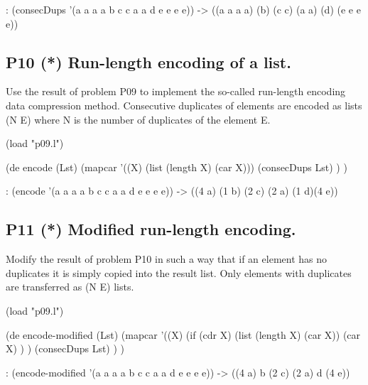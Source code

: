 \begin{wideverbatim}
   : (consecDups '(a a a a b c c a a d e e e e))
   -> ((a a a a) (b) (c c) (a a) (d) (e e e e))
\end{wideverbatim}

\subsection*{{P10} (*) Run-length encoding of a list.}
\label{sec:99-problems-P10}

Use the result of problem P09 to implement the so-called run-length
encoding data compression method. Consecutive duplicates of elements are
encoded as lists (N E) where N is the number of duplicates of the
element E.

\begin{wideverbatim}

(load "p09.l")

(de encode (Lst)
   (mapcar
      '((X) (list (length X) (car X)))
      (consecDups Lst) ) )

\end{wideverbatim}

\begin{wideverbatim}
   : (encode '(a a a a b c c a a d e e e e))
   -> ((4 a) (1 b) (2 c) (2 a) (1 d)(4 e))
\end{wideverbatim}

\pagebreak{}
\subsection*{{P11} (*) Modified run-length encoding.}
\label{sec:99-problems-P11}

Modify the result of problem P10 in such a way that if an element has no
duplicates it is simply copied into the result list. Only elements with
duplicates are transferred as (N E) lists.

\begin{wideverbatim}

(load "p09.l")

(de encode-modified (Lst)
   (mapcar
      '((X)
         (if (cdr X)
            (list (length X) (car X))
            (car X) ) )
      (consecDups Lst) ) )

\end{wideverbatim}

\begin{wideverbatim}
   : (encode-modified '(a a a a b c c a a d e e e e))
   -> ((4 a) b (2 c) (2 a) d (4 e))
\end{wideverbatim}


